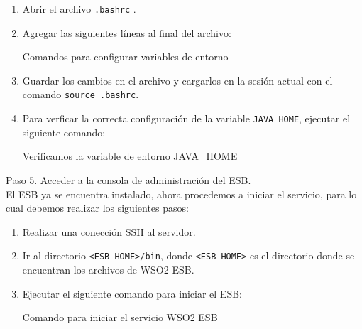 \begin{enumerate}
  \item Abrir el archivo \texttt{.bashrc} .
  \item Agregar las siguientes líneas al final del archivo: \\
        \begin{listing}[H]
          \caption{Comandos para configurar variables de entorno}
          \label{soa:tecnologias:wso2:bash-configurar-variables-de-entorno}
        \end{listing}
  \item Guardar los cambios en el archivo y cargarlos en la sesión actual con el comando \texttt{source .bashrc}.
  \item Para verficar la correcta configuración de la variable \verb|JAVA_HOME|, ejecutar el siguiente comando: \\
        \begin{listing}[H]
          \caption{Verificamos la variable de entorno JAVA\_HOME}
          \label{soa:tecnologias:wso2:bash-verificar-variable-de-entorno}
        \end{listing}
\end{enumerate}

Paso 5. Acceder a la consola de administración del ESB.\\
El ESB ya se encuentra instalado, ahora procedemos a iniciar el servicio, para lo cual debemos realizar los siguientes pasos:

\begin{enumerate}
  \item Realizar una conección SSH al servidor.
  \item Ir al directorio \verb|<ESB_HOME>/bin|, donde \verb|<ESB_HOME>| es el directorio donde se encuentran los archivos de WSO2 ESB.
  \item Ejecutar el siguiente comando para iniciar el ESB:\\
        \begin{listing}[H]
          \caption{Comando para iniciar el servicio WSO2 ESB}
          \label{soa:tecnologias:wso2:bash-inicio-de-servicio}
        \end{listing}
\end{enumerate}


